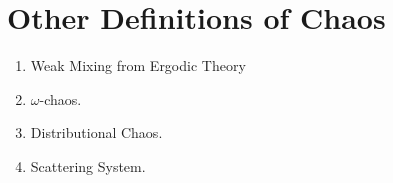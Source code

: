 \documentclass[12pt,twoside,draft]{book}
\begin{document}
\chapter{Other Definitions of Chaos}
\begin{enumerate}
  \item Weak Mixing from Ergodic Theory
  \item $\omega$-chaos\citep{omegachaos}.
  \item Distributional Chaos\citep{dchaos1}\citep{dchaos2}.
  \item Scattering System\citep{blanchard2}.
\end{enumerate}




\printindex
\end{document}
